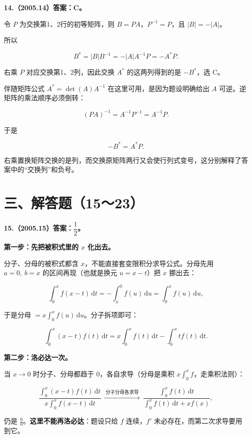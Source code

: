 \documentclass[UTF8,11pt,fontset=windows]{ctexart}
\begin{document}
\clearpage

\textbf{14.（2005.14）答案：C。}

令 $P$ 为交换第1、2行的初等矩阵，则 $B=PA$，$P^{-1}=P$，且 $|B|=-|A|$。

所以

$$
B^*=|B|B^{-1}=-|A|A^{-1}P=-A^*P.
$$

右乘 $P$ 对应交换第1、2列，因此交换 $A^*$ 的这两列得到的是 $-B^*$，选 C。

伴随矩阵公式 $A^*=\det(A)A^{-1}$ 在这里可用，是因为题设明确给出 $A$ 可逆。逆矩阵的乘法顺序必须倒转：

$$
(PA)^{-1}=A^{-1}P^{-1}=A^{-1}P.
$$

于是

$$
-B^*=A^*P.
$$

右乘置换矩阵交换的是列，而交换原矩阵两行又会使行列式变号，这分别解释了答案中的“交换列”和负号。

\clearpage

\section*{三、解答题（15～23）}

\textbf{15.（2005.15）答案：$\dfrac12$。}

\textbf{第一步：先把被积式里的 $x$ 化出去。}

分子、分母的被积式都含 $x$，不能直接套变限积分求导公式。分母先用 $a=0,\ b=x$ 的区间再现（也就是换元 $u=x-t$）把 $x$ 挪出去：

$$
\int_0^x f(x-t)\,\mathrm dt
=-\int_x^0f(u)\,\mathrm du=\int_0^x f(u)\,\mathrm du,
$$

于是分母 $=x\displaystyle\int_0^xf(u)\,\mathrm du$。分子拆项即可：

$$
\int_0^x(x-t)f(t)\,\mathrm dt
=x\int_0^xf(t)\,\mathrm dt-\int_0^xtf(t)\,\mathrm dt.
$$

\textbf{第二步：洛必达一次。}

当 $x\to0$ 时分子、分母都趋于 $0$，各自求导（分母是乘积 $x\displaystyle\int_0^xf$，走乘积法则）：

$$
\frac{\displaystyle\int_0^x(x-t)f(t)\,\mathrm dt}
{\displaystyle x\int_0^xf(x-t)\,\mathrm dt}
\ \xrightarrow{\ \text{分子分母各求导}\ }\
\frac{\displaystyle\int_0^xf(t)\,\mathrm dt}
{\displaystyle\int_0^xf(t)\,\mathrm dt+xf(x)},
$$

仍是 $\frac00$。\textbf{这里不能再洛必达}：题设只给 $f$ 连续，$f'$ 未必存在，而第二次求导要用到它。
\end{document}
